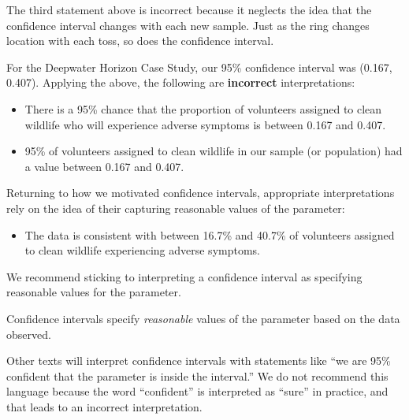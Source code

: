 \documentclass[
  letterpaper,
  DIV=11,
  numbers=noendperiod]{scrreprt}
\providecommand{\tightlist}{%
  \setlength{\itemsep}{0pt}\setlength{\parskip}{0pt}}\usepackage{longtable,booktabs,array}
\theoremstyle{definition}
\theoremstyle{definition}
\theoremstyle{plain}
\theoremstyle{remark}
\begin{document}
The third statement above is incorrect because it neglects the idea that
the confidence interval changes with each new sample. Just as the ring
changes location with each toss, so does the confidence interval.

For the Deepwater Horizon Case Study, our 95\% confidence interval was
(0.167, 0.407). Applying the above, the following are \textbf{incorrect}
interpretations:

\begin{itemize}
\tightlist
\item
  There is a 95\% chance that the proportion of volunteers assigned to
  clean wildlife who will experience adverse symptoms is between 0.167
  and 0.407.
\item
  95\% of volunteers assigned to clean wildlife in our sample (or
  population) had a value between 0.167 and 0.407.
\end{itemize}

Returning to how we motivated confidence intervals, appropriate
interpretations rely on the idea of their capturing reasonable values of
the parameter:

\begin{itemize}
\tightlist
\item
  The data is consistent with between 16.7\% and 40.7\% of volunteers
  assigned to clean wildlife experiencing adverse symptoms.
\end{itemize}

We recommend sticking to interpreting a confidence interval as
specifying reasonable values for the parameter.

\begin{tcolorbox}[enhanced jigsaw, colbacktitle=quarto-callout-tip-color!10!white, colback=white, left=2mm, title=\textcolor{quarto-callout-tip-color}{\faLightbulb}\hspace{0.5em}{Big Idea}, toptitle=1mm, leftrule=.75mm, breakable, bottomrule=.15mm, arc=.35mm, rightrule=.15mm, toprule=.15mm, coltitle=black, opacityback=0, colframe=quarto-callout-tip-color-frame, opacitybacktitle=0.6, bottomtitle=1mm, titlerule=0mm]

Confidence intervals specify \emph{reasonable} values of the parameter
based on the data observed.

\end{tcolorbox}

\begin{tcolorbox}[enhanced jigsaw, colbacktitle=quarto-callout-note-color!10!white, colback=white, left=2mm, title=\textcolor{quarto-callout-note-color}{\faInfo}\hspace{0.5em}{Note}, toptitle=1mm, leftrule=.75mm, breakable, bottomrule=.15mm, arc=.35mm, rightrule=.15mm, toprule=.15mm, coltitle=black, opacityback=0, colframe=quarto-callout-note-color-frame, opacitybacktitle=0.6, bottomtitle=1mm, titlerule=0mm]

Other texts will interpret confidence intervals with statements like
``we are 95\% confident that the parameter is inside the interval.'' We
do not recommend this language because the word ``confident'' is
interpreted as ``sure'' in practice, and that leads to an incorrect
interpretation.

\end{tcolorbox}
\end{document}
